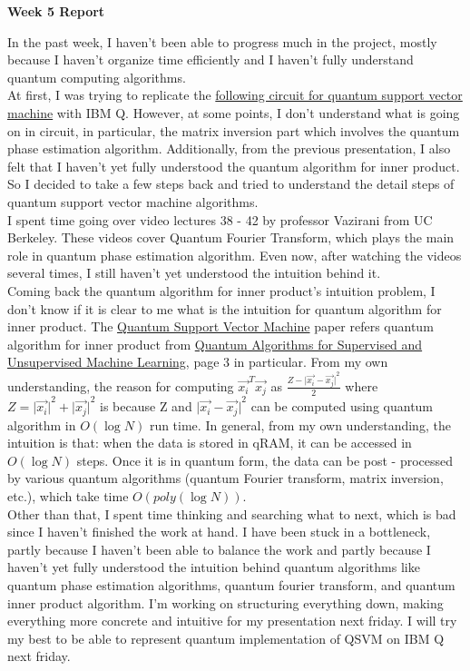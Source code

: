 \documentclass[12pt]{article}
\begin{document}
\begin{center}
\textbf{Week 5 Report}
\end{center}

In the past week, I haven't been able to progress much in the project, mostly because I haven't organize time efficiently and I haven't fully understand quantum computing algorithms. \\

At first, I was trying to replicate the \href{https://github.com/JinlongHuang/quantum-SVM/blob/master/quantum_circuit.ipynb}{following circuit for quantum support vector machine} with IBM Q. However, at some points, I don't understand what is going on in circuit, in particular, the matrix inversion part which involves the quantum phase estimation algorithm. Additionally, from the previous presentation, I also felt that I haven't yet fully understood the quantum algorithm for inner product. So I decided to take a few steps back and tried to understand the detail steps of quantum support vector machine algorithms. \\

I spent time going over video lectures 38 - 42 by professor Vazirani from UC Berkeley. These videos cover Quantum Fourier Transform, which plays the main role in quantum phase estimation algorithm. Even now, after watching the videos several times, I still haven't yet understood the intuition behind it. \\

Coming back the quantum algorithm for inner product's intuition problem, I don't know if it is clear to me what is the intuition for quantum algorithm for inner product. The \href{https://arxiv.org/abs/1307.0471}{Quantum Support Vector Machine} paper refers quantum algorithm for inner product from \href{https://arxiv.org/abs/1307.0411}{Quantum Algorithms for Supervised and Unsupervised Machine Learning}, page 3 in particular. From my own understanding, the reason for computing  $\vec{x_{i}}^T \vec{x_{j}}$ as $\frac{Z - {\vert \vec{x_{i}} - \vec{x_{j}} \vert}^{2}}{2}$ where $Z = {\vert \vec{x_{i}} \vert}^{2} + {\vert \vec{x_{j}} \vert}^{2}$ is because Z and $ {\vert \vec{x_{i}} - \vec{x_{j}} \vert}^{2}$ can be computed using quantum algorithm in $O(\log N)$ run time. In general, from my own understanding, the intuition is that: when the data is stored in qRAM, it can be accessed in $O(\log N)$ steps. Once it is in quantum form, the data can be post - processed by various quantum algorithms (quantum Fourier transform, matrix inversion, etc.), which take time $O(poly(\log N))$. \\

Other than that, I spent time thinking and searching what to next, which is bad since I haven't finished the work at hand. I have been stuck in a bottleneck, partly because I haven't been able to balance the work and partly because I haven't yet fully understood the intuition behind quantum algorithms like quantum phase estimation algorithms, quantum fourier transform, and quantum inner product algorithm. I'm working on structuring everything down, making everything more concrete and intuitive for my presentation next friday. I will try my best to be able to represent quantum implementation of QSVM on IBM Q next friday. 
\end{document}
